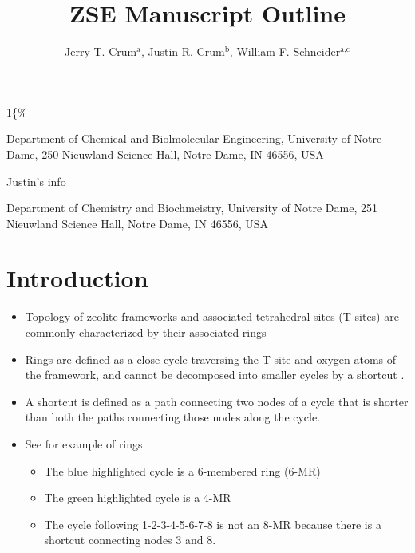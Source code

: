 \documentclass[11pt]{article}
\author{Jerry T. Crum\(^{\text{a}}\), Justin R. Crum\(^{\text{b}}\), William F. Schneider\(^{\text{a,c}}\)}
\date{}
\title{ZSE Manuscript Outline}
\begin{document}
\begin{OPTIONS}
\def\udesoftecoverride\#1\mainmatter\{\%
  \AfterEndPreamble{#1\mainmatter}
\end{OPTIONS}

\maketitle

\begin{asparaenum}[\expandafter\textsuperscript a ]
\item  Department of Chemical and Biolmolecular Engineering, University of Notre Dame, 250 Nieuwland Science Hall, Notre Dame, IN 46556, USA \\
\item Justin's info \\
\item Department of Chemistry and Biochmeistry, University of Notre Dame, 251 Nieuwland Science Hall, Notre Dame, IN 46556, USA
\end{asparaenum}

\newpage
\section*{Introduction}
\label{sec:org9460a91}
\begin{itemize}
\item Topology of zeolite frameworks and associated tetrahedral sites (T-sites) are commonly characterized by their associated rings
\item Rings are defined as a close cycle traversing the T-site and oxygen atoms of the framework, and cannot be decomposed into smaller cycles by a shortcut \cite{goetzke-properties-1991}.
\item A shortcut is defined as a path connecting two nodes of a cycle that is shorter than both the paths connecting those nodes along the cycle.
\item See  for example of rings
\begin{itemize}
\item The blue highlighted cycle is a 6-membered ring (6-MR)
\item The green highlighted cycle is a 4-MR
\item The cycle following 1-2-3-4-5-6-7-8 is not an 8-MR because there is a shortcut connecting nodes 3 and 8.
\end{itemize}
\end{itemize}
\end{document}
